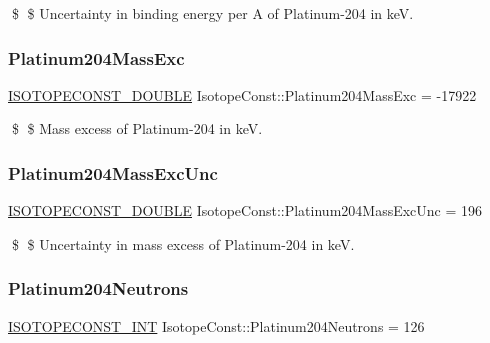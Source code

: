 \$ \$ Uncertainty in binding energy per A of Platinum-\/204 in keV. \mbox{\label{group___isotope_const-_platinum-_pt204_gaaf5b092f4316bd3d29977ab73511cef7}} 
\subsubsection{\texorpdfstring{Platinum204\+Mass\+Exc}{Platinum204MassExc}}
{\footnotesize\ttfamily \mbox{\hyperlink{group___isotope_const-_macros_ga8f45a7272ce02c0b4c65c44636ed719a}{I\+S\+O\+T\+O\+P\+E\+C\+O\+N\+S\+T\+\_\+\+D\+O\+U\+B\+LE}} Isotope\+Const\+::\+Platinum204\+Mass\+Exc = -\/17922}

\$ \$ Mass excess of Platinum-\/204 in keV. \mbox{\label{group___isotope_const-_platinum-_pt204_ga78fcfec714f026f3662ff4b8cef7aad1}} 
\subsubsection{\texorpdfstring{Platinum204\+Mass\+Exc\+Unc}{Platinum204MassExcUnc}}
{\footnotesize\ttfamily \mbox{\hyperlink{group___isotope_const-_macros_ga8f45a7272ce02c0b4c65c44636ed719a}{I\+S\+O\+T\+O\+P\+E\+C\+O\+N\+S\+T\+\_\+\+D\+O\+U\+B\+LE}} Isotope\+Const\+::\+Platinum204\+Mass\+Exc\+Unc = 196}

\$ \$ Uncertainty in mass excess of Platinum-\/204 in keV. \mbox{\label{group___isotope_const-_platinum-_pt204_ga0aadce48c76dd4a898e0b2aa070bdd37}} 
\subsubsection{\texorpdfstring{Platinum204\+Neutrons}{Platinum204Neutrons}}
{\footnotesize\ttfamily \mbox{\hyperlink{group___isotope_const-_macros_ga5f18360b3e99483a35c32d789e62621c}{I\+S\+O\+T\+O\+P\+E\+C\+O\+N\+S\+T\+\_\+\+I\+NT}} Isotope\+Const\+::\+Platinum204\+Neutrons = 126}

